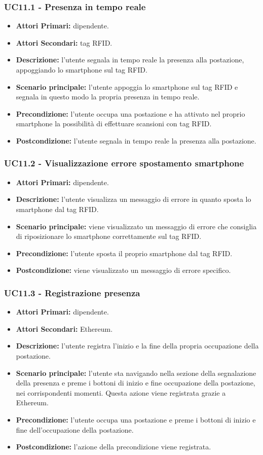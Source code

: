 \subsubsection{ UC11.1 - Presenza in tempo reale}
\begin{itemize}
	\item\textbf{Attori Primari:} dipendente.
	\item\textbf{Attori Secondari:} tag RFID.
	\item\textbf{Descrizione:} l’utente segnala in tempo reale la presenza alla postazione, appoggiando lo smartphone sul tag RFID.
	\item\textbf{Scenario principale:} l’utente appoggia lo smartphone sul tag RFID e segnala in questo modo la propria presenza in tempo reale.
	\item\textbf{Precondizione:} l’utente occupa una postazione e ha attivato nel proprio smartphone la possibilità di effettuare scansioni con tag RFID.
	\item\textbf{Postcondizione:} l’utente segnala in tempo reale la presenza alla postazione.
\end{itemize}
\subsubsection{ UC11.2 - Visualizzazione errore spostamento smartphone}
\begin{itemize}
	\item\textbf{Attori Primari:} dipendente.
	\item\textbf{Descrizione:} l’utente visualizza un messaggio di errore in quanto sposta lo smartphone dal tag RFID.
	\item\textbf{Scenario principale:} viene visualizzato un messaggio di errore che consiglia di riposizionare lo smartphone correttamente sul tag RFID.
	\item\textbf{Precondizione:} l’utente sposta il proprio smartphone dal tag RFID.
	\item\textbf{Postcondizione:} viene visualizzato un messaggio di errore specifico.
\end{itemize}
\subsubsection{ UC11.3 - Registrazione presenza}
\begin{itemize}
	\item\textbf{Attori Primari:} dipendente.
	\item\textbf{Attori Secondari:} Ethereum.
	\item\textbf{Descrizione:} l’utente registra l'inizio e la fine della propria occupazione della postazione.
	\item\textbf{Scenario principale:} l’utente sta navigando nella sezione della segnalazione della presenza e preme i bottoni di inizio e fine occupazione della postazione,
	nei corrispondenti momenti. Questa azione viene registrata grazie a Ethereum.
	\item\textbf{Precondizione:} l’utente occupa una postazione e preme i bottoni di inizio e fine dell'occupazione della postazione.
	\item\textbf{Postcondizione:} l'azione della precondizione viene registrata.
\end{itemize}
